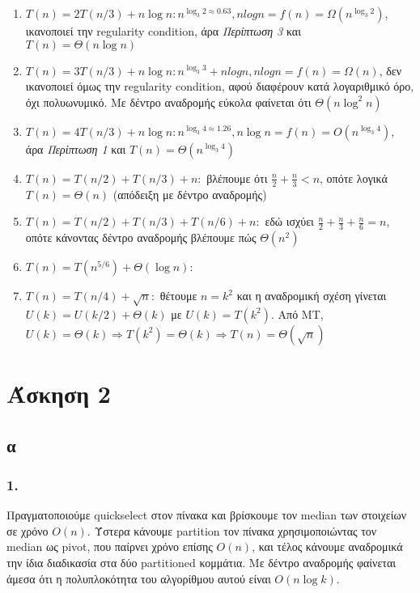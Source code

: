 \documentclass[12pt,a4paper]{article}
\begin{document}
    \begin{enumerate}
      \item \( T(n) = 2T(n/3) + n\log{n} : n^{\log_{3}2 \approx 0.63 }, 
      nlogn = f(n) = \Omega(n^{\log_{3}2}) \), ικανοποιεί την {\latintext 
      regularity condition}, άρα \textit{Περίπτωση 3} και \( T(n)=\Theta(n\log{n}) \)
      \item \( T(n) = 3T(n/3) + n\log{n} : n^{\log_{3}3} + nlogn, nlogn = 
      f(n) = \Omega(n) \), δεν ικανοποιεί όμως την {\latintext regularity 
      condition}, αφού διαφέρουν κατά λογαριθμικό όρο, όχι πολυωνυμικό. Με δέντρο αναδρομής εύκολα φαίνεται ότι \( \Theta(n\log^{2}{n}) \)
      \item \( T(n) = 4T(n/3) + n\log{n} : n^{\log_{3}{4} \approx 1.26}, n\log{n} =
      f(n) = O(n^{\log_{3}4}) \), άρα \textit{Περίπτωση 1} και \( Τ(n) = \Theta(n^{\log_{3}{4}}) \)
      \item \( T(n) = T(n/2) + T(n/3) + n : \) βλέπουμε ότι \( \frac{n}{2} + 
      \frac{n}{3} < n \), οπότε λογικά \( T(n) = \Theta(n) \) (απόδειξη με δέντρο αναδρομής)
      \item \( Τ(n) = T(n/2) + T(n/3) + T(n/6) + n : \) εδώ ισχύει \( \frac{n}{2} 
      + \frac{n}{3} + \frac{n}{6} = n \), οπότε κάνοντας δέντρο αναδρομής βλέπουμε
      πώς \( \Theta(n^2) \) 
      \item \( T(n) = T(n^{5/6}) + \Theta(\log{n}) : \)
      \item \( T(n) = T(n/4) + \sqrt{n} : \) θέτουμε \(n=k^2\) και η αναδρομική 
      σχέση γίνεται \( U(k) = U(k/2) + \Theta(k) \) με \( U(k)=T(k^2) \). Από 
      {\latintext MT}, \( U(k)=\Theta(k) \Rightarrow T(k^2)=\Theta(k) \Rightarrow 
      T(n)=\Theta(\sqrt{n}) \)
    \end{enumerate}

  \section{Άσκηση 2}

  \subsection{α}

  \subsubsection{1.}
    Πραγματοποιούμε {\latintext quickselect} στον πίνακα και βρίσκουμε τον
     {\latintext median} των στοιχείων σε χρόνο \( Ο(n) \).
    Ύστερα κάνουμε {\latintext partition} τον πίνακα χρησιμοποιώντας τον
     {\latintext median} ως {\latintext pivot}, που παίρνει χρόνο επίσης \( Ο(n) \), και τέλος κάνουμε αναδρομικά την ίδια διαδικασία στα δύο {\latintext partitioned} κομμάτια.
    Με δέντρο αναδρομής φαίνεται άμεσα ότι η πολυπλοκότητα του αλγορίθμου
     αυτού είναι \( Ο(n\log{k}) \).
\end{document}
